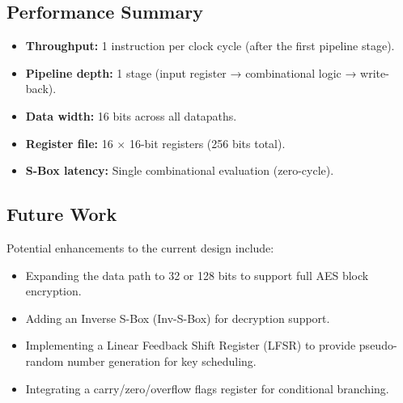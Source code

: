 \documentclass[12pt, a4paper]{report}
\begin{document}
\subsection*{Performance Summary}

\begin{itemize}
  \item \textbf{Throughput:} 1 instruction per clock cycle (after the first pipeline stage).
  \item \textbf{Pipeline depth:} 1 stage (input register → combinational logic → write-back).
  \item \textbf{Data width:} 16 bits across all datapaths.
  \item \textbf{Register file:} 16 $\times$ 16-bit registers (256 bits total).
  \item \textbf{S-Box latency:} Single combinational evaluation (zero-cycle).
\end{itemize}

\subsection*{Future Work}

Potential enhancements to the current design include:

\begin{itemize}
  \item Expanding the data path to 32 or 128 bits to support full AES block encryption.
  \item Adding an Inverse S-Box (Inv-S-Box) for decryption support.
  \item Implementing a Linear Feedback Shift Register (LFSR) to provide
        pseudo-random number generation for key scheduling.
  \item Integrating a carry/zero/overflow flags register for conditional branching.
\end{itemize}
\end{document}
